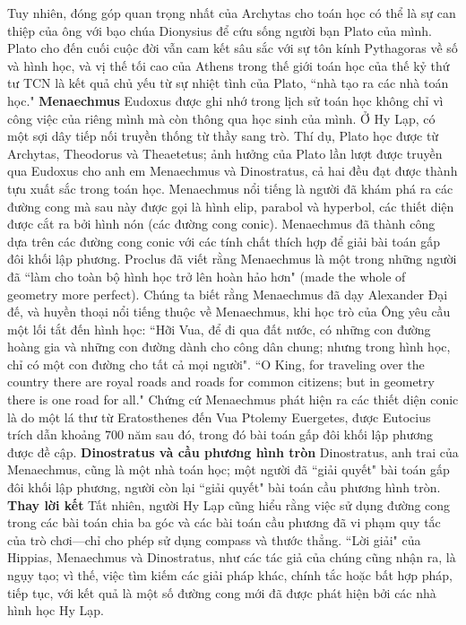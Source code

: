 \begin{multicols}{2}
	\vskip 0.1cm
	Tuy nhiên, đóng góp quan trọng nhất của Archytas cho toán học có thể là sự can thiệp của ông với bạo chúa Dionysius để cứu sống người bạn Plato của mình. Plato cho đến cuối cuộc đời vẫn cam kết sâu sắc với sự tôn kính Pythagoras về số và hình học, và vị thế tối cao của Athens trong thế giới toán học của thế kỷ thứ tư TCN là kết quả chủ yếu từ sự nhiệt tình của Plato, ``nhà tạo ra các nhà toán học." 
	\vskip 0.1cm
	\textbf{\color{lichsutoanhoc}Menaechmus}
	\vskip 0.1cm
	Eudoxus được ghi nhớ trong lịch sử toán học không chỉ vì công việc của riêng mình mà còn thông qua học sinh của mình. 
	\vskip 0.1cm
	Ở Hy Lạp, có một sợi dây tiếp nối truyền thống từ thầy sang trò.  Thí dụ, Plato học được từ Archytas, Theodorus và Theaetetus; ảnh hưởng của Plato lần lượt được truyền qua Eudoxus cho anh em Menaechmus và Dinostratus, cả hai đều đạt được thành tựu xuất sắc trong toán học. 
	\vskip 0.1cm
	Menaechmus nổi tiếng là người đã khám phá ra các đường cong mà sau này được gọi là hình elip, parabol và hyperbol, các thiết diện được cắt ra bởi hình nón (các đường cong conic).
	\vskip 0.1cm
	Menaechmus đã thành công dựa trên các đường cong conic với các tính chất thích hợp để giải bài toán gấp đôi khối lập phương. 
	\vskip 0.1cm
	Proclus đã viết rằng Menaechmus là một trong những người đã ``làm cho toàn bộ hình học trở lên hoàn hảo hơn" (made the whole of geometry more perfect). Chúng ta biết rằng Menaechmus đã dạy Alexander Đại đế, và huyền thoại nổi tiếng thuộc về Menaechmus, khi học trò của Ông yêu cầu một lối tắt đến hình học: ``Hỡi Vua, để đi qua đất nước, có những con đường hoàng gia và những con đường dành cho công dân chung; nhưng trong hình học, chỉ có một con đường cho tất cả mọi người". ``O King, for traveling over the
	country there are royal roads and roads for common citizens; but in geometry there is one road for all."
	\vskip 0.1cm 
	Chứng cứ Menaechmus phát hiện ra các thiết diện conic là do một lá thư từ Eratosthenes đến Vua Ptolemy Euergetes, được Eutocius trích dẫn khoảng $700$ năm sau đó, trong đó bài toán gấp đôi khối lập phương được đề cập. 
	\vskip 0.1cm
	\textbf{\color{lichsutoanhoc}Dinostratus và cầu phương hình tròn}
	\vskip 0.1cm
	Dinostratus, anh trai của Menaechmus, cũng là một nhà toán học; một người đã ``giải quyết" bài toán gấp đôi khối lập phương, người còn lại ``giải quyết" bài toán cầu phương hình tròn. 
	\vskip 0.1cm
	\textbf{\color{lichsutoanhoc}Thay lời kết}
	\vskip 0.1cm
	Tất nhiên, người Hy Lạp cũng hiểu rằng việc sử dụng đường cong trong các bài toán chia ba góc và các bài toán cầu phương đã vi phạm quy tắc của trò chơi—chỉ cho phép sử dụng compass và thước thẳng. ``Lời giải" của Hippias, Menaechmus và Dinostratus, như các tác giả của chúng cũng nhận ra, là ngụy tạo; vì thế, việc tìm kiếm các giải pháp khác, chính tắc hoặc bất hợp pháp, tiếp tục, với kết quả là một số đường cong mới đã được phát hiện bởi các nhà hình học Hy Lạp.

\end{multicols}
